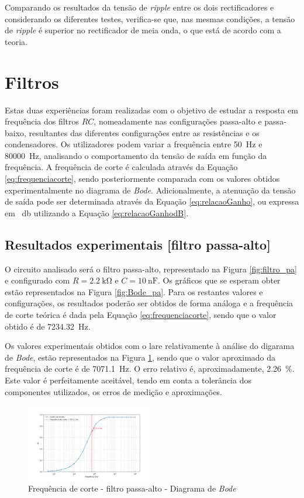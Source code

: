 Comparando os resultados da tensão de \textit{ripple} entre os dois rectificadores e considerando os diferentes testes, verifica-se que, nas mesmas condições, a tensão de \textit{ripple} é superior no rectificador de meia onda, o que está de acordo com a teoria.


\section{Filtros}
\label{sec:resultados_filtros}
Estas duas experiências foram realizadas com o objetivo de estudar a resposta em frequência dos filtros $RC$, nomeadamente nas configurações passa-alto e passa-baixo, resultantes das diferentes configurações entre as resistências e os condensadores. Os utilizadores podem variar a frequência entre \SI{50}{\hertz} e \SI{80000}{\hertz}, analisando o comportamento da tensão de saída em função da frequência. A frequência de corte é calculada através da Equação \ref{eq:frequenciacorte}, sendo posteriormente comparada com os valores obtidos experimentalmente no diagrama de \textit{Bode}. Adicionalmente, a atenuação da tensão de saída pode ser determinada através da Equação \ref{eq:relacaoGanho}, ou expressa em \SI{}{\decibel} utilizando a Equação \ref{eq:relacaoGanhodB}.

\subsection{Resultados experimentais [filtro passa-alto]}
\label{sec:resultados_filtros_passaalto}
O circuito analisado será o filtro passa-alto, representado na Figura \ref{fig:filtro_pa} e configurado com $R=\SI{2.2}{\kilo\ohm}$ e $C=\SI{10}{\nano\farad}$. Os gráficos que se esperam obter estão representados na Figura \ref{fig:Bode_pa}. Para os restantes valores e configurações, os resultados poderão ser obtidos de forma análoga e a frequência de corte teórica é dada pela Equação \ref{eq:frequenciacorte}, sendo que o valor obtido é de \SI{7234.32}{\hertz}.

Os valores experimentais obtidos com o \acrshort{lare} relativamente à análise do digarama de \textit{Bode}, estão representados na Figura \ref{fig:fcBode}, sendo que o valor aproximado da frequência de corte é de \SI{7071.1}{\hertz}. O erro relativo é, aproximadamente, \SI{2.26}{\percent}. Este valor é perfeitamente aceitável, tendo em conta a tolerância dos componentes utilizados, os erros de medição e aproximações.

\begin{figure}[hbtp]
	\centering
	\includegraphics[width=0.5\textwidth]{figures/bode_hpf_fc.png}
	\caption{Frequência de corte - filtro passa-alto - Diagrama de \textit{Bode}}
	\label{fig:fcBode}
\end{figure}

